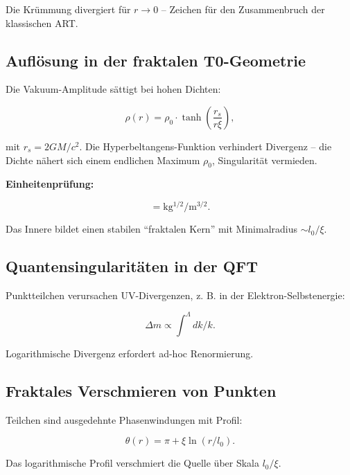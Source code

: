 	Die Krümmung divergiert für \(r \to 0\) – Zeichen für den Zusammenbruch der klassischen ART.
	
	\subsection*{Auflösung in der fraktalen T0-Geometrie}
	
	Die Vakuum-Amplitude sättigt bei hohen Dichten:
	
	\begin{equation}
		\rho(r) = \rho_0 \cdot \tanh\left(\frac{r_s}{r \xi}\right),
	\end{equation}
	
	mit \(r_s = 2GM/c^2\). Die Hyperbeltangens-Funktion verhindert Divergenz – die Dichte nähert sich einem endlichen Maximum \(\rho_0\), Singularität vermieden.
	
	\textbf{Einheitenprüfung:}
	
	\begin{equation}
		[\rho(r)] = \si{\kilo\gram^{1/2}\per\meter^{3/2}}.
	\end{equation}
	
	Das Innere bildet einen stabilen \enquote{fraktalen Kern} mit Minimalradius \(\sim l_0 / \xi\).
	
	\subsection*{Quantensingularitäten in der QFT}
	
	Punktteilchen verursachen UV-Divergenzen, z. B. in der Elektron-Selbstenergie:
	
	\begin{equation}
		\Delta m \propto \int^\Lambda dk/k.
	\end{equation}
	
	Logarithmische Divergenz erfordert ad-hoc Renormierung.
	
	\subsection*{Fraktales Verschmieren von Punkten}
	
	Teilchen sind ausgedehnte Phasenwindungen mit Profil:
	
	\begin{equation}
		\theta(r) = \pi + \xi \ln(r/l_0).
	\end{equation}
	
	Das logarithmische Profil verschmiert die Quelle über Skala \(l_0 / \xi\).
	
